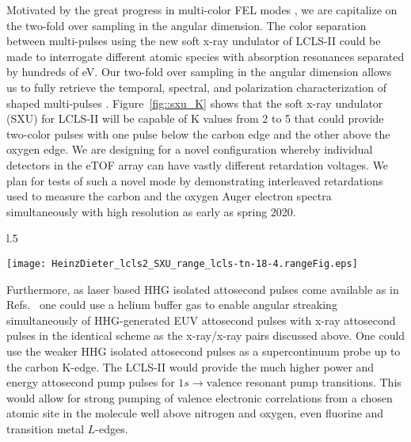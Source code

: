 Motivated by the great progress in multi-color FEL modes \cite{Lutman13_twocolor,Marinelli13_twocolor,Allaria2014,Marinelli2015,Prince2016,Lutman2016,Marinelli2016,Lutman2016FreshSlice}, we are capitalize on the two-fold over sampling in the angular dimension.
The color separation between multi-pulses using the new soft x-ray undulator of LCLS-II could be made to interrogate different atomic species with absorption resonances separated by hundreds of eV.
Our two-fold over sampling in the angular dimension allows us to fully retrieve the temporal, spectral, and polarization characterization of shaped multi-pulses \cite{Lutman2016,Lutman2016FreshSlice}.
Figure~\ref{fig::sxu_K} shows that the soft x-ray undulator (SXU) for LCLS-II will be capable of K values from 2 to 5 that could provide two-color pulses with one pulse below the carbon edge and the other above the oxygen edge.
We are designing for a novel configuration whereby individual detectors in the eTOF array can have vastly different retardation voltages.
We plan for tests of such a novel mode by demonstrating interleaved retardations used to measure the carbon and the oxygen Auger electron spectra simultaneously with high resolution as early as spring 2020.
\begin{wrapfigure}[27]{l}{.5\linewidth}
\centerline{
	\texttt{[image: HeinzDieter\_lcls2\_SXU\_range\_lcls-tn-18-4.rangeFig.eps]}
	}
	\caption{\label{fig::sxu_K} Soft x-ray undulator tuning range. \cite{HeinzDieter_SXU_twocolor}
		}
\end{wrapfigure}

Furthermore, as laser based HHG isolated attosecond pulses come available as in Refs.~\cite{Chen2014,Schmidt2016,Biegert2016,WornerSci2017} one could use a helium buffer gas to enable angular streaking simultaneously of HHG-generated EUV attosecond pulses with x-ray attosecond pulses in the identical scheme as the x-ray/x-ray pairs discussed above.
One could use the weaker HHG isolated attosecond pulses \cite{Biegert2016} as a supercontinuum probe up to the carbon K-edge.
The LCLS-II would provide the much higher power and energy attosecond pump pulses for $1s\rightarrow\mbox{valence}$ resonant pump transitions.
This would allow for strong pumping of valence electronic correlations from a chosen atomic site in the molecule well above nitrogen and oxygen, even fluorine and transition metal $L$-edges.

